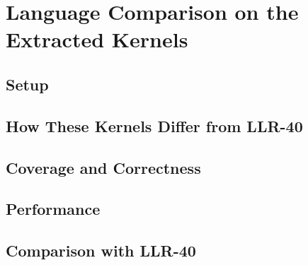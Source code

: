 \chapter{Language Comparison on the Extracted Kernels}
\label{ch:extracted-languages}

\section{Setup}

\section{How These Kernels Differ from LLR-40}

\section{Coverage and Correctness}

\section{Performance}

\section{Comparison with LLR-40}
